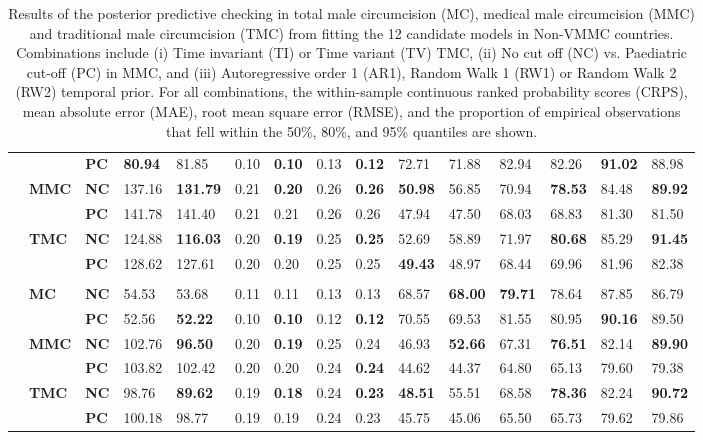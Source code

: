 \documentclass{article}
\begin{document}
\begin{landscape}
{\begin{table}[H]
\begin{tabular}{>{\bfseries}p{0.05cm} p{0.85cm} p{0.75cm} C{1.25cm} C{1.25cm} C{1.25cm} C{1.25cm} C{1.25cm} C{1.25cm} C{1.25cm} C{1.25cm} C{1.25cm} C{1.25cm} C{1.25cm} C{1.25cm}}
  &  & \bf PC & \bf 80.94 &  81.85 &   0.10 & \bf  0.10 &   0.13 & \bf  0.12 &  72.71 &  71.88 &  82.94 &  82.26 & \bf 91.02 &  88.98 & \\[3pt] 
  & \bf MMC & \bf NC & 137.16 & \bf131.79 &   0.21 & \bf  0.20 &   0.26 & \bf  0.26 & \bf 50.98 &  56.85 &  70.94 & \bf 78.53 &  84.48 & \bf 89.92 & \\ 
  &  & \bf PC & 141.78 & 141.40 &   0.21 &   0.21 &   0.26 &   0.26 &  47.94 &  47.50 &  68.03 &  68.83 &  81.30 &  81.50 & \\[3pt] 
  & \bf TMC & \bf NC & 124.88 & \bf116.03 &   0.20 & \bf  0.19 &   0.25 & \bf  0.25 &  52.69 &  58.89 &  71.97 & \bf 80.68 &  85.29 & \bf 91.45 & \\ 
  &  & \bf PC & 128.62 & 127.61 &   0.20 &   0.20 &   0.25 &   0.25 & \bf 49.43 &  48.97 &  68.44 &  69.96 &  81.96 &  82.38 & \\[3pt] 
     \\ 
 & \bf MC & \bf NC &  54.53 &  53.68 &   0.11 &   0.11 &   0.13 &   0.13 &  68.57 & \bf 68.00 & \bf 79.71 &  78.64 &  87.85 &  86.79 & \\ 
  &  & \bf PC &  52.56 & \bf 52.22 &   0.10 & \bf  0.10 &   0.12 & \bf  0.12 &  70.55 &  69.53 &  81.55 &  80.95 & \bf 90.16 &  89.50 & \\[3pt] 
  & \bf MMC & \bf NC & 102.76 & \bf 96.50 &   0.20 & \bf  0.19 &   0.25 &   0.24 &  46.93 & \bf 52.66 &  67.31 & \bf 76.51 &  82.14 & \bf 89.90 & \\ 
  &  & \bf PC & 103.82 & 102.42 &   0.20 &   0.20 &   0.24 & \bf  0.24 &  44.62 &  44.37 &  64.80 &  65.13 &  79.60 &  79.38 & \\[3pt] 
  & \bf TMC & \bf NC &  98.76 & \bf 89.62 &   0.19 & \bf  0.18 &   0.24 & \bf  0.23 & \bf 48.51 &  55.51 &  68.58 & \bf 78.36 &  82.24 & \bf 90.72 & \\ 
  &  & \bf PC & 100.18 &  98.77 &   0.19 &   0.19 &   0.24 &   0.23 &  45.75 &  45.06 &  65.50 &  65.73 &  79.62 &  79.86 & \\[3pt] 
  \hline 
  \end{tabular} 
  \caption{Results of the posterior predictive checking in total male 
    circumcision (MC), medical male circumcision (MMC) and traditional male 
    circumcision (TMC) from fitting the 12 candidate models in Non-VMMC countries. Combinations include (i) Time invariant (TI) or Time variant (TV) TMC, 
    (ii) No cut off (NC) vs. Paediatric cut-off (PC) in MMC, and (iii) 
    Autoregressive order 1 (AR1), Random Walk 1 (RW1) or Random Walk 2 (RW2) 
    temporal prior. For all combinations, the within-sample continuous ranked 
    probability scores (CRPS), mean absolute error (MAE), root mean square 
    error (RMSE), and the proportion of empirical observations that fell within 
    the 50\%, 80\%, and 95\% quantiles are shown.} 
  \label{tab::PPC2 Non-VMMC} 
\end{table}} 

\end{landscape}
\end{document}
